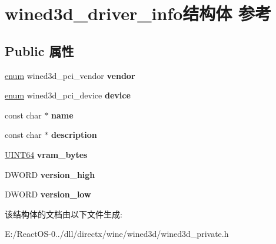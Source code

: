 \hypertarget{structwined3d__driver__info}{}\section{wined3d\+\_\+driver\+\_\+info结构体 参考}
\label{structwined3d__driver__info}
\subsection*{Public 属性}
\begin{DoxyCompactItemize}
\item 
\mbox{\label{structwined3d__driver__info_a337f0cc45e52de1917c3150cfdc0ea93}} 
\hyperlink{interfaceenum}{enum} wined3d\+\_\+pci\+\_\+vendor {\bfseries vendor}
\item 
\mbox{\label{structwined3d__driver__info_a5ede08031414e76fcfc7a128c110b933}} 
\hyperlink{interfaceenum}{enum} wined3d\+\_\+pci\+\_\+device {\bfseries device}
\item 
\mbox{\label{structwined3d__driver__info_a90adb8076e0d9ace62c01944ea965ef6}} 
const char $\ast$ {\bfseries name}
\item 
\mbox{\label{structwined3d__driver__info_aa9f352e3fb79c27a6052dbb48f98506d}} 
const char $\ast$ {\bfseries description}
\item 
\mbox{\label{structwined3d__driver__info_aab7938cf61ce3dd1f4b8968b58ffec5f}} 
\hyperlink{_processor_bind_8h_a57be03562867144161c1bfee95ca8f7c}{U\+I\+N\+T64} {\bfseries vram\+\_\+bytes}
\item 
\mbox{\label{structwined3d__driver__info_a4fbc9c647b228b4208cd582a137c085a}} 
D\+W\+O\+RD {\bfseries version\+\_\+high}
\item 
\mbox{\label{structwined3d__driver__info_a6dad96b4e41ccb255611085a8a8a947e}} 
D\+W\+O\+RD {\bfseries version\+\_\+low}
\end{DoxyCompactItemize}


该结构体的文档由以下文件生成\+:\begin{DoxyCompactItemize}
\item 
E\+:/\+React\+O\+S-\/0../dll/directx/wine/wined3d/wined3d\+\_\+private.\+h\end{DoxyCompactItemize}
